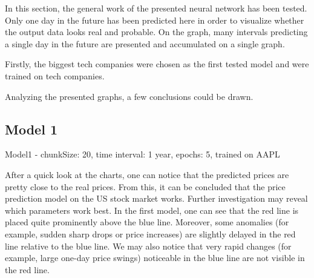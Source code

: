 In this section, the general work of the presented neural network has been tested. Only one day in the future has been predicted here in order to visualize whether the output data looks real and probable. On the graph, many intervals predicting a single day in the future are presented and accumulated on a single graph.

Firstly, the biggest tech companies were chosen as the first tested model and were trained on tech companies.

Analyzing the presented graphs, a few conclusions could be drawn.


\subsection{Model 1}

Model1 - chunkSize: 20, time interval: 1 year, epochs: 5, trained on AAPL\par\bigskip
After a quick look at the charts,  one can notice that the predicted prices are pretty close to the real prices. From this, it can be concluded that the price prediction model on the US stock market works. Further investigation may reveal which parameters work best.
In the first model, one can see that the red line is placed quite prominently above the blue line. Moreover, some anomalies (for example, sudden sharp drops or price increases) are slightly delayed in the red line relative to the blue line. We may also notice that very rapid changes (for example, large one-day price swings) noticeable in the blue line are not visible in the red line.
\clearpage
